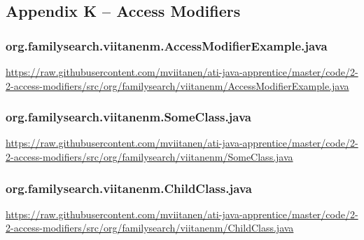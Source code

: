 \subsection*{Appendix K -- Access Modifiers} \label{App:AppendixK}

\subsubsection*{org.familysearch.viitanenm.AccessModifierExample.java}
\noindent
\begin{minipage}{.6in}
\end{minipage}
\begin{minipage}{6in}
  \url{https://raw.githubusercontent.com/mviitanen/ati-java-apprentice/master/code/2-2-access-modifiers/src/org/familysearch/viitanenm/AccessModifierExample.java}
\end{minipage}

\vspace{1em}
\subsubsection*{org.familysearch.viitanenm.SomeClass.java}
\noindent
\begin{minipage}{.6in}
\end{minipage}
\begin{minipage}{6in}
  \url{https://raw.githubusercontent.com/mviitanen/ati-java-apprentice/master/code/2-2-access-modifiers/src/org/familysearch/viitanenm/SomeClass.java}
\end{minipage}

\vspace{1em}
\subsubsection*{org.familysearch.viitanenm.ChildClass.java}
\noindent
\begin{minipage}{.6in}
\end{minipage}
\begin{minipage}{6in}
  \url{https://raw.githubusercontent.com/mviitanen/ati-java-apprentice/master/code/2-2-access-modifiers/src/org/familysearch/viitanenm/ChildClass.java}
\end{minipage}

